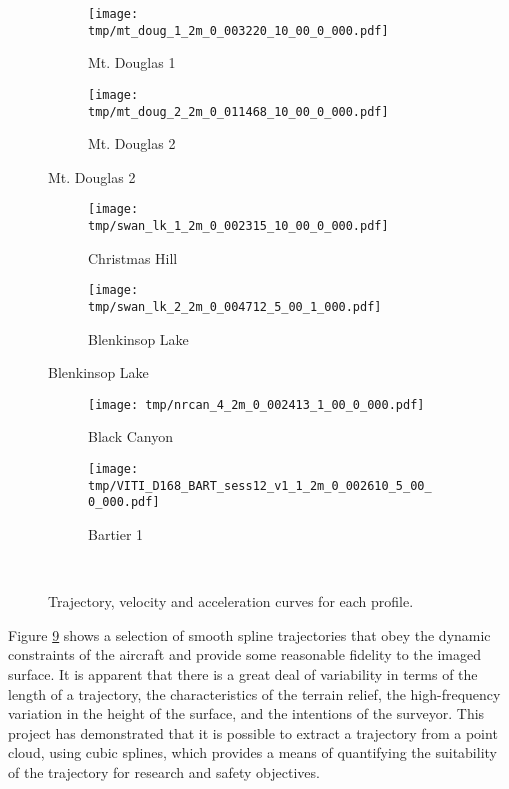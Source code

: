 \documentclass[doc]{apa6}
\begin{document}
\begin{figure} %
\begin{subfigure}[b]{\linewidth}
\texttt{[image: tmp/mt\_doug\_1\_2m\_0\_003220\_10\_00\_0\_000.pdf]} 
\caption{Mt. Douglas 1} \label{subfig:mt_doug_1}
\end{subfigure}
\begin{subfigure}[b]{\linewidth}
\texttt{[image: tmp/mt\_doug\_2\_2m\_0\_011468\_10\_00\_0\_000.pdf]} 
\caption{Mt. Douglas 2} \label{subfig:mt_doug_2}
\end{subfigure}
\end{figure}

\begin{figure}\ContinuedFloat
\begin{subfigure}[b]{\linewidth}
\texttt{[image: tmp/swan\_lk\_1\_2m\_0\_002315\_10\_00\_0\_000.pdf]} 
\caption{Christmas Hill} \label{subfig:swan_1}
\end{subfigure}
\begin{subfigure}[b]{\linewidth}
\texttt{[image: tmp/swan\_lk\_2\_2m\_0\_004712\_5\_00\_1\_000.pdf]} 
\caption{Blenkinsop Lake} \label{subfig:swan_2}
\end{subfigure}
\end{figure}

\begin{figure}\ContinuedFloat
\begin{subfigure}[b]{\linewidth}
\texttt{[image: tmp/nrcan\_4\_2m\_0\_002413\_1\_00\_0\_000.pdf]} 
\caption{Black Canyon} \label{subfig:thompson}
\end{subfigure}
\begin{subfigure}[b]{\linewidth}
\texttt{[image: tmp/VITI\_D168\_BART\_sess12\_v1\_1\_2m\_0\_002610\_5\_00\_0\_000.pdf]} 
\caption{Bartier 1} \label{subfig:bartier_1}
\end{subfigure}
~
\caption{Trajectory, velocity and acceleration curves for each profile.}
\label{fig:profiles}
\end{figure}

Figure \ref{fig:profiles} shows a selection of smooth spline trajectories that obey the dynamic constraints of the aircraft and provide some reasonable fidelity to the imaged surface. It is apparent that there is a great deal of variability in terms of the length of a trajectory, the characteristics of the terrain relief, the high-frequency variation in the height of the surface, and the intentions of the surveyor. This project has demonstrated that it is possible to extract a trajectory from a point cloud, using cubic splines, which provides a means of quantifying the suitability of the trajectory for research and safety objectives.
\end{document}
